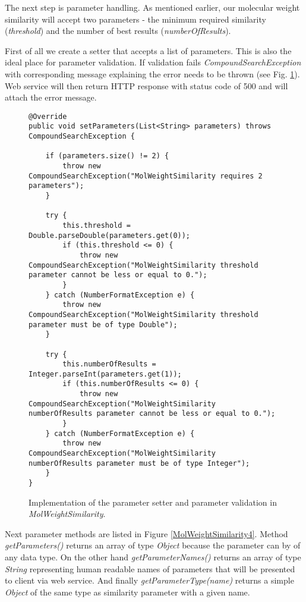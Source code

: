 \documentclass[thesis=M,english]{FITthesis}[2012/10/20]
\begin{document}
The next step is parameter handling. As mentioned earlier, our molecular weight similarity will accept two parameters - the minimum required similarity (\textit{threshold}) and the number of best results (\textit{numberOfResults}).  

First of all we create a setter that accepts a list of parameters. This is also the ideal place for parameter validation. If validation fails \textit{CompoundSearchException} with corresponding message explaining the error needs to be thrown (see Fig. \ref{MolWeightSimilarity3}). Web service will then return HTTP response with status code of 500 and will attach the error message. 

\begin{figure}
\begin{lstlisting}
@Override
public void setParameters(List<String> parameters) throws CompoundSearchException {

    if (parameters.size() != 2) {
        throw new CompoundSearchException("MolWeightSimilarity requires 2 parameters");
    }

    try {
        this.threshold = Double.parseDouble(parameters.get(0));
        if (this.threshold <= 0) {
            throw new CompoundSearchException("MolWeightSimilarity threshold parameter cannot be less or equal to 0.");
        }
    } catch (NumberFormatException e) {
        throw new CompoundSearchException("MolWeightSimilarity threshold parameter must be of type Double");
    }
	
    try {
        this.numberOfResults = Integer.parseInt(parameters.get(1));	
        if (this.numberOfResults <= 0) {
            throw new CompoundSearchException("MolWeightSimilarity numberOfResults parameter cannot be less or equal to 0.");
        }
    } catch (NumberFormatException e) {
        throw new CompoundSearchException("MolWeightSimilarity numberOfResults parameter must be of type Integer");
    }
}

\end{lstlisting}
\caption{Implementation of the parameter setter and parameter validation in \textit{MolWeightSimilarity}.}
\label{MolWeightSimilarity3}
\end{figure}


Next parameter methods are listed in Figure \ref{MolWeightSimilarity4}. Method \textit{getParameters()} returns an array of type \textit{Object} because the parameter can by of any data type. On the other hand \textit{getParameterNames()} returns an array of type \textit{String} representing human readable names of parameters that will be presented to client via web service.  And finally \textit{getParameterType(name)} returns a simple \textit{Object} of the same type as similarity parameter with a given name.
\end{document}
